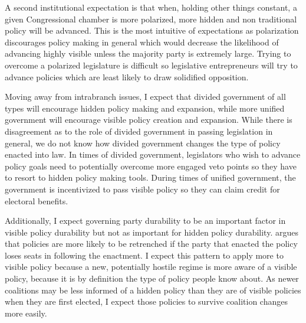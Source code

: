 \documentclass[12pt]{article}
\begin{document}
A second institutional expectation is that when, holding other things constant, a given Congressional chamber is more polarized, more hidden and non traditional policy will be advanced. This is the most intuitive of expectations as polarization discourages policy making in general which would decrease the likelihood of advancing highly visible unless the majority party is extremely large. Trying to overcome a polarized legislature is difficult so legislative entrepreneurs will try to advance policies which are least likely to draw solidified opposition.

Moving away from intrabranch issues, I expect that divided government of all types will encourage hidden policy making and expansion, while more unified government will encourage visible policy creation and expansion. While there is disagreement as to the role of divided government in passing legislation in general, we do not know how divided government changes the type of policy enacted into law. In times of divided government, legislators who wish to advance policy goals need to potentially overcome more engaged veto points so they have to resort to hidden policy making tools. During times of unified government, the government is incentivized to pass visible policy so they can claim credit for electoral benefits.

Additionally, I expect governing party durability to be an important factor in visible policy durability but not as important for hidden policy durability. \citet{berry2012} argues that policies are more likely to be retrenched if the party that enacted the policy loses seats in following the enactment. I expect this pattern to apply more to visible policy because a new, potentially hostile regime is more aware of a visible policy, because it is by definition the type of policy people know about. As newer coalitions may be less informed of a hidden policy than they are of visible policies when they are first elected, I expect those policies to survive coalition changes more easily. 
\end{document}
